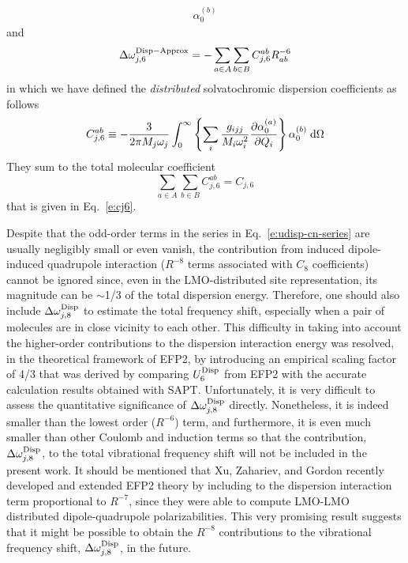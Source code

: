 \documentclass[b5paper,oneside,fleqn,11pt]{book}
\begin{document}
\begin{refsection}
\begin{multline}
\alpha_0^{(b)} 
\end{multline}
%
and 
%
\begin{equation} \label{e:dw-disp-6-iso-approx-distributed}
\Delta \omega_{j,6}^{\rm Disp-Approx} = 
- \sum_{a\in  A}\sum_{b\in B}
C^{ab}_{j,6} R^{-6}_{ab}  
\end{equation}
%
in which we have defined the \emph{distributed} solvatochromic 
dispersion coefficients as follows
%
\begin{equation} \label{e:cj6-distributed}
C^{ab}_{j,6} \equiv -\frac{3}{2\pi M_j\omega_j}
\int_{0}^{\infty} 
\left\{
\sum_i \frac{g_{ijj}}{M_i\omega_i^2} 
\frac{\partial \alpha_0^{(a)}}{\partial Q_i}
\right\}
\alpha_0^{(b)}  \;{\rm d}\Omega  
\end{equation}
%
They sum to the total molecular coefficient
%
\begin{equation}
\sum_{a\in  A}\sum_{b\in B} C^{ab}_{j,6}  =  C_{j,6} 
\end{equation}
%
that is given in Eq.~\eqref{e:cj6}.

Despite that the odd\hyp{}order terms in the series in Eq.~\eqref{e:udisp-cn-series} 
are usually negligibly small or even vanish, the contribution 
from induced dipole\hyp{}induced quadrupole interaction 
($R^{-8}$ terms associated with $C_8$ coefficients) 
cannot be ignored since, even in the LMO\hyp{}distributed 
site representation, its magnitude can be $\sim$1/3 of the total 
dispersion energy. \citep{Adamovic.Gordon.MolPhys.2005} Therefore, one should also include 
$\Delta\omega_{j,8}^{\rm Disp}$ to estimate the total 
frequency shift, especially when a pair of molecules 
are in close vicinity to each other. This difficulty 
in taking into account the higher\hyp{}order contributions 
to the dispersion interaction energy was resolved, in the 
theoretical framework of EFP2, by introducing an empirical 
scaling factor of 4/3 that was derived by comparing 
$U^{\rm Disp}_6$ from EFP2 with the accurate calculation results 
obtained with SAPT. \citep{Jeziorski.Moszynski.Szalewicz.ChemRev.1994,
Adamovic.Gordon.MolPhys.2005} Unfortunately, it is very 
difficult to assess the quantitative significance of 
$\Delta\omega_{j,8}^{\rm Disp}$ directly. Nonetheless, 
it is indeed smaller than the lowest order ($R^{-6}$) term, 
and furthermore, it is even much smaller than other 
Coulomb and induction terms so that the contribution, 
$\Delta\omega_{j,8}^{\rm Disp}$, to the total vibrational 
frequency shift will not be included in the present work. 
It should be mentioned that Xu, Zahariev, and Gordon 
recently developed and extended EFP2 theory by including 
to the dispersion interaction term proportional to $R^{-7}$, 
since they were able to compute LMO\hyp{}LMO distributed 
dipole\hyp{}quadrupole polarizabilities. \citep{Xu.Zahariev.Gordon.JCTC.2014} 
This very promising result suggests that it might be 
possible to obtain the $R^{-8}$ contributions to the 
vibrational frequency shift, $\Delta\omega_{j,8}^{\rm Disp}$, 
in the future.



\end{refsection}
\end{document}
